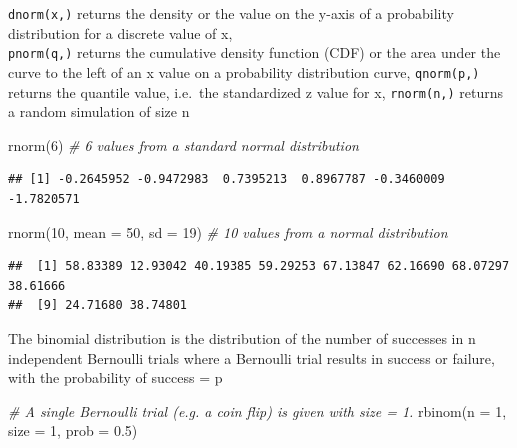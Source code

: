 \documentclass[
]{book}
\newenvironment{Shaded}{\begin{snugshade}}{\end{snugshade}}
\newcommand{\AttributeTok}[1]{\textcolor[rgb]{0.77,0.63,0.00}{#1}}
\newcommand{\CommentTok}[1]{\textcolor[rgb]{0.56,0.35,0.01}{\textit{#1}}}
\newcommand{\DecValTok}[1]{\textcolor[rgb]{0.00,0.00,0.81}{#1}}
\newcommand{\FloatTok}[1]{\textcolor[rgb]{0.00,0.00,0.81}{#1}}
\newcommand{\FunctionTok}[1]{\textcolor[rgb]{0.00,0.00,0.00}{#1}}
\newcommand{\NormalTok}[1]{#1}
\begin{document}
\texttt{dnorm(x,)} returns the density or the value on the y-axis of a probability distribution for a discrete value of x,\\
\texttt{pnorm(q,)} returns the cumulative density function (CDF) or the area under the curve to the left of an x value on a probability distribution curve,
\texttt{qnorm(p,)} returns the quantile value, i.e.~the standardized z value for x,
\texttt{rnorm(n,)} returns a random simulation of size n

\begin{Shaded}
\begin{Highlighting}[]
\FunctionTok{rnorm}\NormalTok{(}\DecValTok{6}\NormalTok{) }\CommentTok{\#  6 values from a standard normal distribution}
\end{Highlighting}
\end{Shaded}

\begin{verbatim}
## [1] -0.2645952 -0.9472983  0.7395213  0.8967787 -0.3460009 -1.7820571
\end{verbatim}

\begin{Shaded}
\begin{Highlighting}[]
\FunctionTok{rnorm}\NormalTok{(}\DecValTok{10}\NormalTok{, }\AttributeTok{mean =} \DecValTok{50}\NormalTok{, }\AttributeTok{sd =} \DecValTok{19}\NormalTok{) }\CommentTok{\# 10 values from a normal distribution}
\end{Highlighting}
\end{Shaded}

\begin{verbatim}
##  [1] 58.83389 12.93042 40.19385 59.29253 67.13847 62.16690 68.07297 38.61666
##  [9] 24.71680 38.74801
\end{verbatim}

The binomial distribution is the distribution of the number of successes in n independent Bernoulli trials where a Bernoulli trial results in success or failure, with the probability of success = p

\begin{Shaded}
\begin{Highlighting}[]
\CommentTok{\# A single Bernoulli trial (e.g. a coin flip) is given with size = 1.}
\FunctionTok{rbinom}\NormalTok{(}\AttributeTok{n =} \DecValTok{1}\NormalTok{, }\AttributeTok{size =} \DecValTok{1}\NormalTok{, }\AttributeTok{prob =} \FloatTok{0.5}\NormalTok{)}
\end{Highlighting}
\end{Shaded}
\end{document}
